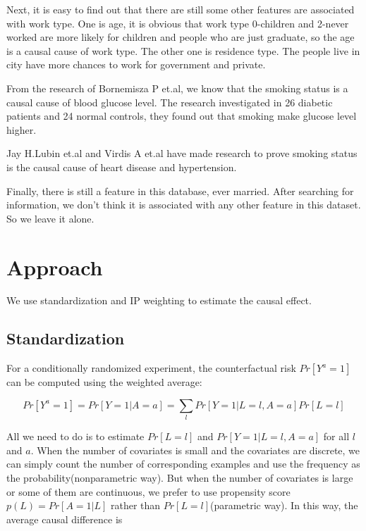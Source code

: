 \documentclass[letterpaper,12pt]{article}
\begin{document}
Next, it is easy to find out that there are still some other features are associated with work type. One is age, it is obvious that work type 0-children and 2-never worked are more likely for children and people who are just graduate, so the age is a causal cause of work type. The other one is residence type. The people live in city have more chances to work for government and private.\par

From the research of Bornemisza P et.al\cite{bornemisza1980effect}, we know that the smoking status is a causal cause of blood glucose level. The research investigated in 26 diabetic patients and 24 normal controls, they found out that smoking make glucose level higher.\par

Jay H.Lubin et.al\cite{lubin2016risk} and Virdis A et.al\cite{virdis2010cigarette} have made research to prove smoking status is the causal cause of heart disease and hypertension.\par

Finally, there is still a feature in this database, ever married. After searching for information, we don’t think it is associated with any other feature in this dataset. So we leave it alone.\par



\section{Approach}

We use standardization and IP weighting to estimate the causal effect.
\subsection{Standardization}
For a conditionally randomized experiment, the counterfactual risk $Pr[Y^{a}=1]$ can be computed using the weighted average:

\begin{footnotesize}
\begin{equation}
Pr[Y^{a}=1] = Pr[Y=1|A=a] = \sum_{l}Pr[Y=1|L=l,A=a]Pr[L=l]
\end{equation}
\end{footnotesize}


All we need to do is to estimate $Pr[L=l]$ and $Pr[Y=1|L=l,A=a]$ for all $l$ and $a$. When the number of covariates is small and the covariates are discrete, we can simply count the number of corresponding examples and use the frequency as the probability(nonparametric way). But when the number of covariates is large or some of them are continuous, we prefer to use propensity score $p(L)=Pr[A=1|L]$ rather than $Pr[L=l]$(parametric way). In this way, the average causal difference is 
\end{document}
